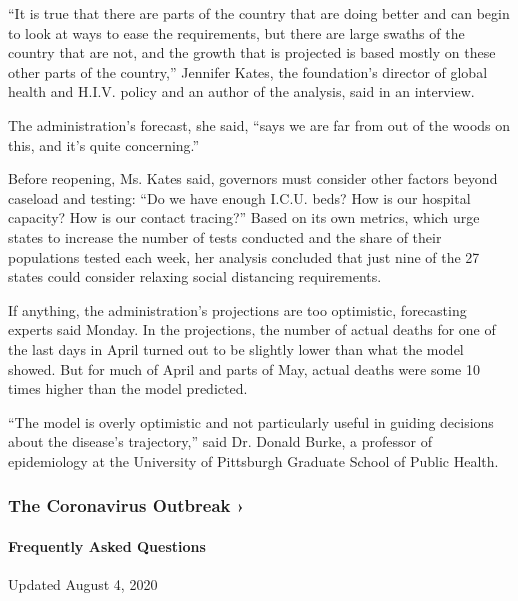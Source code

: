 ``It is true that there are parts of the country that are doing better
and can begin to look at ways to ease the requirements, but there are
large swaths of the country that are not, and the growth that is
projected is based mostly on these other parts of the country,''
Jennifer Kates, the foundation's director of global health and H.I.V.
policy and an author of the analysis, said in an interview.

The administration's forecast, she said, ``says we are far from out of
the woods on this, and it's quite concerning.''

Before reopening, Ms. Kates said, governors must consider other factors
beyond caseload and testing: ``Do we have enough I.C.U. beds? How is our
hospital capacity? How is our contact tracing?'' Based on its own
metrics, which urge states to increase the number of tests conducted and
the share of their populations tested each week, her analysis concluded
that just nine of the 27 states could consider relaxing social
distancing requirements.

If anything, the administration's projections are too optimistic,
forecasting experts said Monday. In the projections, the number of
actual deaths for one of the last days in April turned out to be
slightly lower than what the model showed. But for much of April and
parts of May, actual deaths were some 10 times higher than the model
predicted.

``The model is overly optimistic and not particularly useful in guiding
decisions about the disease's trajectory,'' said Dr. Donald Burke, a
professor of epidemiology at the University of Pittsburgh Graduate
School of Public Health.

\href{https://www.nytimes3xbfgragh.onion/news-event/coronavirus?action=click\&pgtype=Article\&state=default\&region=MAIN_CONTENT_3\&context=storylines_faq}{}

\hypertarget{the-coronavirus-outbreak-}{%
\subsubsection{The Coronavirus Outbreak
›}\label{the-coronavirus-outbreak-}}

\hypertarget{frequently-asked-questions}{%
\paragraph{Frequently Asked
Questions}\label{frequently-asked-questions}}

Updated August 4, 2020

